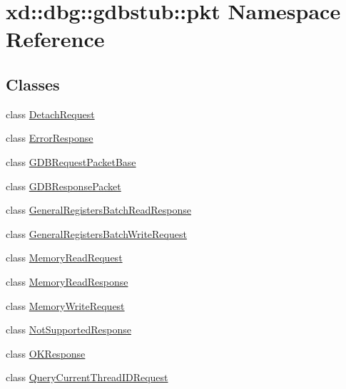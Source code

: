 \hypertarget{namespacexd_1_1dbg_1_1gdbstub_1_1pkt}{}\section{xd\+:\+:dbg\+:\+:gdbstub\+:\+:pkt Namespace Reference}
\label{namespacexd_1_1dbg_1_1gdbstub_1_1pkt}
\subsection*{Classes}
\begin{DoxyCompactItemize}
\item 
class \mbox{\hyperlink{classxd_1_1dbg_1_1gdbstub_1_1pkt_1_1_detach_request}{Detach\+Request}}
\item 
class \mbox{\hyperlink{classxd_1_1dbg_1_1gdbstub_1_1pkt_1_1_error_response}{Error\+Response}}
\item 
class \mbox{\hyperlink{classxd_1_1dbg_1_1gdbstub_1_1pkt_1_1_g_d_b_request_packet_base}{G\+D\+B\+Request\+Packet\+Base}}
\item 
class \mbox{\hyperlink{classxd_1_1dbg_1_1gdbstub_1_1pkt_1_1_g_d_b_response_packet}{G\+D\+B\+Response\+Packet}}
\item 
class \mbox{\hyperlink{classxd_1_1dbg_1_1gdbstub_1_1pkt_1_1_general_registers_batch_read_response}{General\+Registers\+Batch\+Read\+Response}}
\item 
class \mbox{\hyperlink{classxd_1_1dbg_1_1gdbstub_1_1pkt_1_1_general_registers_batch_write_request}{General\+Registers\+Batch\+Write\+Request}}
\item 
class \mbox{\hyperlink{classxd_1_1dbg_1_1gdbstub_1_1pkt_1_1_memory_read_request}{Memory\+Read\+Request}}
\item 
class \mbox{\hyperlink{classxd_1_1dbg_1_1gdbstub_1_1pkt_1_1_memory_read_response}{Memory\+Read\+Response}}
\item 
class \mbox{\hyperlink{classxd_1_1dbg_1_1gdbstub_1_1pkt_1_1_memory_write_request}{Memory\+Write\+Request}}
\item 
class \mbox{\hyperlink{classxd_1_1dbg_1_1gdbstub_1_1pkt_1_1_not_supported_response}{Not\+Supported\+Response}}
\item 
class \mbox{\hyperlink{classxd_1_1dbg_1_1gdbstub_1_1pkt_1_1_o_k_response}{O\+K\+Response}}
\item 
class \mbox{\hyperlink{classxd_1_1dbg_1_1gdbstub_1_1pkt_1_1_query_current_thread_i_d_request}{Query\+Current\+Thread\+I\+D\+Request}}
\item 

\end{DoxyCompactItemize}
